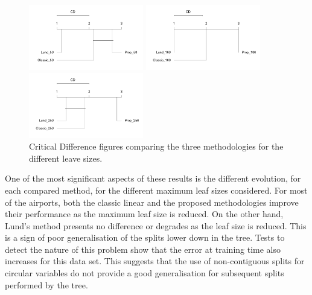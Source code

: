 \documentclass[times,twocolumn,final,authoryear]{elsarticle}
\begin{document}
\begin{figure}
\centering
\parbox{5cm}{
\includegraphics[width=5cm]{CD_50.png}}
\qquad
\begin{minipage}{5cm}
\includegraphics[width=5cm]{CD_100.png}
\qquad
\end{minipage}
\qquad
\begin{minipage}{5cm}
\includegraphics[width=5cm]{CD_250.png}
\qquad
\end{minipage}
\caption{Critical Difference figures comparing the three methodologies for the different leave sizes.}
\label{f7}
\end{figure}

One of the most significant aspects of these results is the different evolution, for each compared method, for the different maximum leaf sizes considered. For most of the airports, both the classic linear and the proposed methodologies improve their performance as the maximum leaf size is reduced. On the other hand, Lund's method presents no difference or degrades as the leaf size is reduced. This is a sign of poor generalisation of the splits lower down in the tree. Tests to detect the nature of this problem show that the error at training time also increases for this data set. This suggests that the use of non-contiguous splits for circular variables do not provide a good generalisation for subsequent splits performed by the tree.
\end{document}
